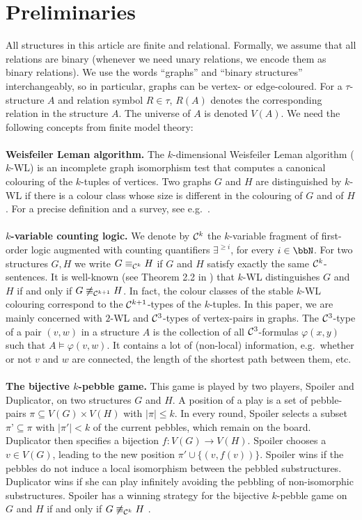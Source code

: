 \documentclass[a4paper,UKenglish,cleveref, autoref, thm-restate]{lipics-v2021}
\renewcommand{\phi}{\varphi}
\newcommand{\lra}{\longrightarrow}
\renewcommand{\phi}{\varphi}
\newcommand{\Cc}{{\cal C}}
\begin{document}
	\section{Preliminaries}
	All structures in this article are finite and relational. Formally, we assume that all relations are binary (whenever we need unary relations, we encode them as binary relations). We use the words ``graphs'' and ``binary structures'' interchangeably, so in particular, graphs can be vertex- or edge-coloured.  
	For a $\tau$-structure $A$ and relation symbol $R \in \tau$, $R(A)$ denotes the corresponding relation in the structure $A$. The universe of $A$ is denoted $V(A)$. We need the following concepts from finite model theory:\\
	\\
	\textbf{Weisfeiler Leman algorithm.} The $k$-dimensional Weisfeiler Leman algorithm ($k$-WL) is an incomplete graph isomorphism test that computes a canonical colouring of the $k$-tuples of vertices. Two graphs $G$ and $H$ are distinguished by $k$-WL if there is a colour class whose size is different in the colouring of $G$ and of $H$. For a precise definition and a survey, see e.g.\  \cite{sandraSiglog}.\\
	\\
	\textbf{$k$-variable counting logic.} We denote by $\Cc^k$ the $k$-variable fragment of first-order logic augmented with counting quantifiers $\exists^{\geq i}$, for every $i \in \bbN$. For two structures $G,H$ we write $G \equiv_{\Cc^k} H$ if $G$ and $H$ satisfy exactly the same $\Cc^k$-sentences. It is well-known (see Theorem 2.2 in \cite{sandraSiglog}) that $k$-WL distinguishes $G$ and $H$ if and only if $G \not\equiv_{\Cc^{k+1}} H$. In fact, the colour classes of the stable $k$-WL colouring correspond to the $\Cc^{k+1}$-types of the $k$-tuples. In this paper, we are mainly concerned with $2$-WL and $\Cc^3$-types of vertex-pairs in graphs. The $\Cc^3$-type of a pair $(v,w)$ in a structure $A$ is the collection of all $\Cc^3$-formulas $\phi(x,y)$ such that $A \models \phi(v,w)$. It contains a lot of (non-local) information, e.g.\ whether or not $v$ and $w$ are connected, the length of the shortest path between them, etc.\\
	\\
	\textbf{The bijective $k$-pebble game.} This game is played by two players, Spoiler and Duplicator, on two structures $G$ and $H$. A position of a play is a set of pebble-pairs $\pi \subseteq V(G) \times V(H)$ with $|\pi| \leq k$. In every round, Spoiler selects a subset $\pi’ \subseteq \pi$ with $|\pi'| < k$ of the current pebbles, which remain on the board. Duplicator then specifies a bijection $f : V(G) \lra V(H)$. Spoiler chooses a $v \in V(G)$, leading to the new position $\pi' \cup \{(v,f(v))\}$. Spoiler wins if the pebbles do not induce a local isomorphism between the pebbled substructures. Duplicator wins if she can play infinitely avoiding the pebbling of non-isomorphic substructures. Spoiler has a winning strategy for the bijective $k$-pebble game on $G$ and $H$ if and only if $G \not\equiv_{\Cc^k} H$ \cite{hella1996logical}.\\
\end{document}
